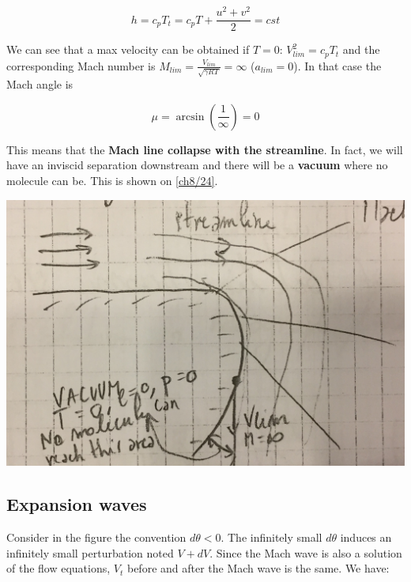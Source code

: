 	\begin{equation}
	h = c_pT_t = c_p T + \frac{u^2 + v^2}{2} = cst
	\end{equation}
	
	We can see that a max velocity can be obtained if $T = 0$: $V_{lim}^2 = c_p T_t$ and the corresponding Mach number is $M_{lim} = \frac{V_{lim}}{\sqrt{\gamma RT}} = \infty$ ($a_{lim}=0$). In that case the Mach angle is 
	
	\begin{equation}
	\mu = \arcsin \left( \frac{1}{\infty} \right) = 0
	\end{equation}
	
	This means that the \textbf{Mach line collapse with the streamline}. In fact, we will have an inviscid separation downstream and there will be a \textbf{vacuum} where no molecule can be. This is shown on \autoref{ch8/24}.
	
	\begin{center}
	\includegraphics[scale=0.07]{ch8/24}
	\label{ch8/24}
	\end{center}
	
\subsection{Expansion waves}
	Consider in the figure the convention $d\theta < 0$. The infinitely small $d\theta$ induces an infinitely small perturbation noted $V+dV$. Since the Mach wave is also a solution of the flow equations, $V_t$ before and after the Mach wave is the same. We have: 
	
	\ \\
	
